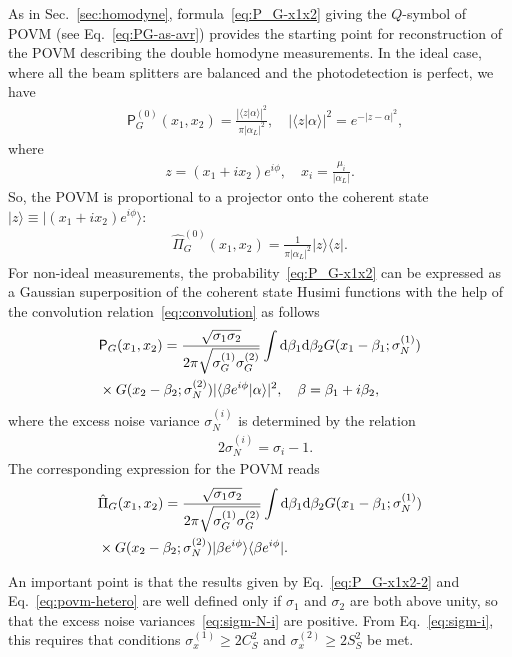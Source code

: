 \documentclass[%
reprint,
superscriptaddress,
 amsmath,amssymb,amsfonts,
 aps,
 pra,
 longbibliography
]{revtex4-2}
\newcommand{\ket}[1]{\ensuremath{|{#1}\rangle}}
\newcommand{\bra}[1]{\ensuremath{\langle{#1}|}}
\newcommand{\avr}[1]{\ensuremath{\langle{#1}\rangle}}
\newcommand{\prob}{\mathsf{P}}
\newcommand{\dd}{\mathrm{d}}
\begin{document}
As in Sec.~\ref{sec:homodyne},
formula~\eqref{eq:P_G-x1x2}
giving the $Q$-symbol of POVM (see Eq.~\eqref{eq:PG-as-avr})
provides the starting point for reconstruction of the POVM
describing the double homodyne measurements.
In the ideal case, where all the beam splitters are balanced
and the photodetection is perfect,
we have
\begin{align}
  &
  \label{eq:P0-hetero}
    \prob_{G}^{(0)}(x_1,x_2)=\frac{|\avr{z|\alpha}|^2}{\pi |\alpha_L|^2},\quad
|\avr{z|\alpha}|^2=e^{-|z-\alpha|^2},
\end{align}
where
\begin{align}
  \label{eq:z}
    z=(x_1+ix_2) e^{i\phi},\quad     x_i=\frac{\mu_i}{|\alpha_L|}.
\end{align}
So, the POVM is proportional to a projector onto the coherent state
$\ket{z}\equiv\ket{(x_1+ix_2)e^{i\phi}}$:
\begin{align}
  \label{eq:POVM-hetero-ideal}
    \hat{\Pi}_G^{(0)}(x_1,x_2)=\frac{1}{\pi |\alpha_L|^2} \ket{z}\bra{z}.
\end{align}
For non-ideal measurements, the probability~\eqref{eq:P_G-x1x2}
can be expressed
as a Gaussian superposition of the coherent state Husimi functions
with the help of the convolution relation~\eqref{eq:convolution}
as follows
\begin{align}
  \label{eq:P_G-x1x2-2}
  &
    \prob_G(x_1,x_2)=\frac{\sqrt{\sigma_1\sigma_2}}{2\pi\sqrt{\sigma_G^{(1)}\sigma_G^{(2)}}}
\int \dd \beta_1\dd \beta_2
    G(x_1-\beta_1;\sigma_N^{(1)})
    \notag
  \\
  &
    \times
    G(x_2-\beta_2;\sigma_N^{(2)})
    |\avr{\beta e^{i\phi}|\alpha}|^2,\quad \beta=\beta_1+i\beta_2,
\end{align}
where the excess noise variance
$\sigma_N^{(i)}$ is determined by the relation
\begin{align}
  &
    \label{eq:sigm-N-i}
    2\sigma_{N}^{(i)}=\sigma_i-1.
\end{align}
The corresponding expression for the POVM reads
\begin{align}
  &
  \label{eq:povm-hetero}
    \hat{\Pi}_G(x_1,x_2)=\frac{\sqrt{\sigma_1\sigma_2}}{2\pi\sqrt{\sigma_G^{(1)}\sigma_G^{(2)}}}
\int \dd \beta_1\dd \beta_2
    G(x_1-\beta_1;\sigma_N^{(1)})
    \notag
  \\
  &
    \times
    G(x_2-\beta_2;\sigma_N^{(2)})
    \ket{\beta e^{i\phi}}\bra{\beta e^{i\phi}}.
\end{align}

An important point is that
the results given by Eq.~\eqref{eq:P_G-x1x2-2}
and Eq.~\eqref{eq:povm-hetero}
are well defined only if $\sigma_1$ and $\sigma_2$
are both above unity,
so that the excess noise variances~\eqref{eq:sigm-N-i} are
positive.
From Eq.~\eqref{eq:sigm-i},
this requires that conditions
$\sigma_x^{(1)}\ge 2 C_S^2$
and $\sigma_x^{(2)}\ge 2 S_S^2$ be met.
\end{document}
